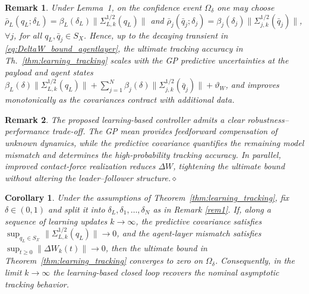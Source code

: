 \documentclass[letterpaper, 10 pt, conference]{ieeeconf}  %
\newcommand{\0}{\matr{0}}
\newtheorem{corollary}{Corollary}
\newtheorem{remark}{Remark}
\begin{document}
\begin{remark}
\label{rem:gp_covariance_bound}
Under Lemma~1, on the confidence event $\Omega_\delta$ one may choose $\bar\rho_L(q_L;\delta_L)=\beta_L(\delta_L)\|\Sigma^{1/2}_{L,k}(q_L)\|$ and  $\bar\rho_j(\bar q_j;\delta_j)=\beta_j(\delta_j)\|\Sigma^{1/2}_{j,k}(\bar q_j)\|$, $\forall j$, for all $q_L,\bar q_j\in S_X$.
Hence, up to the decaying transient in \eqref{eq:DeltaW_bound_agentlayer}, the ultimate tracking accuracy
in Th.~\ref{thm:learning_tracking} scales with the GP predictive uncertainties at the payload and agent states $\displaystyle{\beta_L(\delta)\big\|\Sigma_{L,k}^{1/2}(q_L)\big\|
+\sum_{j=1}^N \beta_j(\delta)\big\|\Sigma_{j,k}^{1/2}(\bar q_j)\big\|
+\vartheta_W}$, and improves monotonically as the covariances contract with additional data.
\end{remark}

\begin{remark}The proposed learning-based controller admits a clear robustness--performance trade-off.
The GP mean provides feedforward compensation of unknown dynamics, while the predictive covariance quantifies the remaining
model mismatch and determines the high-probability tracking accuracy. In parallel, improved contact-force realization reduces
$\Delta W$, tightening the ultimate bound without altering the leader--follower structure.\hfill$\diamond$\end{remark}

\begin{corollary}
\label{cor:asymptotic_recovery}
Under the assumptions of Theorem~\ref{thm:learning_tracking}, fix $\delta\in(0,1)$ and split it into
$\delta_L,\delta_1,\dots,\delta_N$ as in Remark \ref{rem1}.
If, along a sequence of learning updates $k\to\infty$, the predictive covariance satisfies
$\displaystyle{\sup_{q_L\in S_{\mathcal X}}}\big\|\Sigma_{L,k}^{1/2}(q_L)\big\|\to0$, and the agent-layer mismatch satisfies
$\displaystyle{\sup_{t\ge 0}}\|\Delta W_k(t)\|\to0$, then the ultimate bound in Theorem~\ref{thm:learning_tracking} converges to zero on $\Omega_\delta$.
Consequently, in the limit $k\to\infty$ the learning-based closed loop recovers the nominal asymptotic tracking behavior.
\end{corollary}
\end{document}
